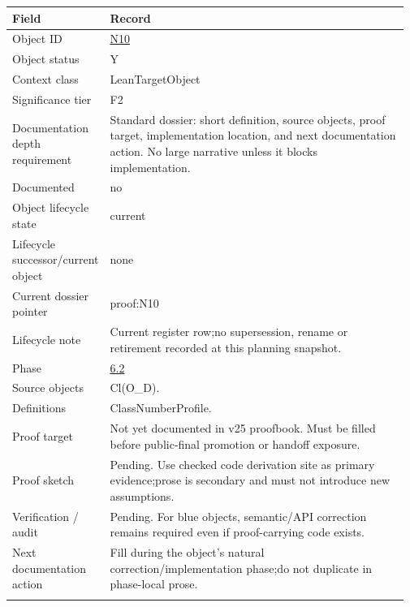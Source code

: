 \begin{longtable}{L{0.16\linewidth} L{0.81\linewidth}}
\hline
\textbf{Field} & \textbf{Record}\\
\hline
Object ID & \hyperlink{object-row-N10}{N10}\\
\hline\addlinespace[0.20em]
Object status & Y\\
\hline\addlinespace[0.20em]
Context class & LeanTargetObject\\
\hline\addlinespace[0.20em]
Significance tier & F2\\
\hline\addlinespace[0.20em]
Documentation depth requirement & Standard dossier: short definition, source objects, proof target, implementation location, and next documentation action. No large narrative unless it blocks implementation.\\
\hline\addlinespace[0.20em]
Documented & no\\
\hline\addlinespace[0.20em]
Object lifecycle state & current\\
\hline\addlinespace[0.20em]
Lifecycle successor/\allowbreak{}current object & none\\
\hline\addlinespace[0.20em]
Current dossier pointer & proof:N10\\
\hline\addlinespace[0.20em]
Lifecycle note & Current register row;\newline no supersession, rename or retirement recorded at this planning snapshot.\\
\hline\addlinespace[0.20em]
Phase & \hyperlink{phase-row-6-2}{6.2}\\
\hline\addlinespace[0.20em]
Source objects & Cl(O\_D).\\
\hline\addlinespace[0.20em]
Definitions & ClassNumberProfile.\\
\hline\addlinespace[0.20em]
Proof target & Not yet documented in v25 proofbook. Must be filled before public-final promotion or handoff exposure.\\
\hline\addlinespace[0.20em]
Proof sketch & Pending. Use checked code derivation site as primary evidence;\newline prose is secondary and must not introduce new assumptions.\\
\hline\addlinespace[0.20em]
Verification /\allowbreak{} audit & Pending. For blue objects, semantic/\allowbreak{}API correction remains required even if proof-carrying code exists.\\
\hline\addlinespace[0.20em]
Next documentation action & Fill during the object's natural correction/\allowbreak{}implementation phase;\newline do not duplicate in phase-local prose.\\
\hline\addlinespace[0.20em]
\end{longtable}

